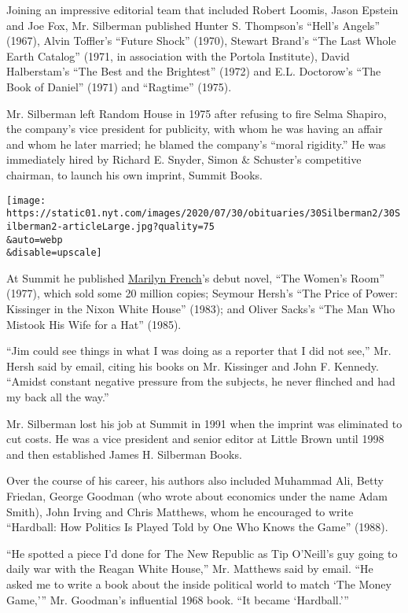 Joining an impressive editorial team that included Robert Loomis, Jason
Epstein and Joe Fox, Mr. Silberman published Hunter S. Thompson's
``Hell's Angels'' (1967), Alvin Toffler's ``Future Shock'' (1970),
Stewart Brand's ``The Last Whole Earth Catalog'' (1971, in association
with the Portola Institute), David Halberstam's ``The Best and the
Brightest'' (1972) and E.L. Doctorow's ``The Book of Daniel'' (1971) and
``Ragtime'' (1975).

Mr. Silberman left Random House in 1975 after refusing to fire Selma
Shapiro, the company's vice president for publicity, with whom he was
having an affair and whom he later married; he blamed the company's
``moral rigidity.'' He was immediately hired by Richard E. Snyder, Simon
\& Schuster's competitive chairman, to launch his own imprint, Summit
Books.

\texttt{[image: https://static01.nyt.com/images/2020/07/30/obituaries/30Silberman2/30Silberman2-articleLarge.jpg?quality=75\\\&auto=webp\\\&disable=upscale]}

At Summit he published
\href{https://www.nytimes.com/2009/05/04/arts/04french.html}{Marilyn
French}'s debut novel, ``The Women's Room'' (1977), which sold some 20
million copies; Seymour Hersh's ``The Price of Power: Kissinger in the
Nixon White House'' (1983); and Oliver Sacks's ``The Man Who Mistook His
Wife for a Hat'' (1985).

``Jim could see things in what I was doing as a reporter that I did not
see,'' Mr. Hersh said by email, citing his books on Mr. Kissinger and
John F. Kennedy. ``Amidst constant negative pressure from the subjects,
he never flinched and had my back all the way.''

Mr. Silberman lost his job at Summit in 1991 when the imprint was
eliminated to cut costs. He was a vice president and senior editor at
Little Brown until 1998 and then established James H. Silberman Books.

Over the course of his career, his authors also included Muhammad Ali,
Betty Friedan, George Goodman (who wrote about economics under the name
Adam Smith), John Irving and Chris Matthews, whom he encouraged to write
``Hardball: How Politics Is Played Told by One Who Knows the Game''
(1988).

``He spotted a piece I'd done for The New Republic as Tip O'Neill's guy
going to daily war with the Reagan White House,'' Mr. Matthews said by
email. ``He asked me to write a book about the inside political world to
match `The Money Game,''' Mr. Goodman's influential 1968 book. ``It
became `Hardball.'''


